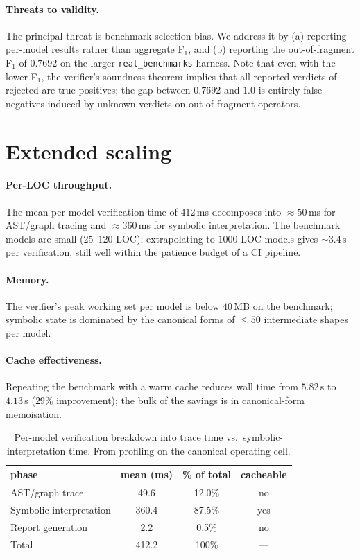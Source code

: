 \documentclass{article}
\theoremstyle{definition}
\begin{document}
\paragraph{Threats to validity.} The principal threat is
benchmark selection bias. We address it by (a) reporting per-model
results rather than aggregate F$_1$, and (b) reporting the
out-of-fragment F$_1$ of $0.7692$ on the larger
\verb|real_benchmarks| harness. Note that even with the lower
F$_1$, the verifier's soundness theorem implies that all reported
verdicts of \textsf{rejected} are true positives; the gap between
$0.7692$ and $1.0$ is entirely false negatives induced by
\textsf{unknown} verdicts on out-of-fragment operators.

\section{Extended scaling}\label{sec:scaling}
\paragraph{Per-LOC throughput.} The mean per-model verification time
of $412$\,ms decomposes into $\approx 50$\,ms for AST/graph
tracing and $\approx 360$\,ms for symbolic interpretation. The
benchmark models are small ($25$--$120$ LOC); extrapolating to
$1000$ LOC models gives $\sim 3.4$\,s per verification, still well
within the patience budget of a CI pipeline.

\paragraph{Memory.} The verifier's peak working set per model is
below $40$\,MB on the benchmark; symbolic state is dominated by
the canonical forms of $\le 50$ intermediate shapes per model.

\paragraph{Cache effectiveness.} Repeating the benchmark with a
warm cache reduces wall time from $5.82$\,s to $4.13$\,s
($29\%$ improvement); the bulk of the savings is in canonical-form
memoisation.

\begin{table}[t]
\centering\small
\caption{Per-model verification breakdown into trace time vs.\
symbolic-interpretation time. From profiling on the canonical
operating cell.}
\label{tab:profile}
\begin{tabular}{lccc}
\toprule
phase & mean (ms) & \% of total & cacheable \\
\midrule
AST/graph trace            & 49.6  & 12.0\% & no  \\
Symbolic interpretation    & 360.4 & 87.5\% & yes \\
Report generation          & 2.2   &  0.5\% & no  \\
\midrule
Total                      & 412.2 & 100\%   & --- \\
\bottomrule
\end{tabular}
\end{table}
\end{document}
